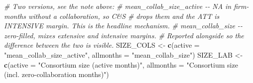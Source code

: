 \documentclass[
]{article}
\newenvironment{Shaded}{\begin{snugshade}}{\end{snugshade}}
\newcommand{\AttributeTok}[1]{\textcolor[rgb]{0.13,0.29,0.53}{#1}}
\newcommand{\CommentTok}[1]{\textcolor[rgb]{0.56,0.35,0.01}{\textit{#1}}}
\newcommand{\FunctionTok}[1]{\textcolor[rgb]{0.13,0.29,0.53}{\textbf{#1}}}
\newcommand{\NormalTok}[1]{#1}
\newcommand{\OtherTok}[1]{\textcolor[rgb]{0.56,0.35,0.01}{#1}}
\newcommand{\StringTok}[1]{\textcolor[rgb]{0.31,0.60,0.02}{#1}}
\begin{document}
\begin{Shaded}
\begin{Highlighting}[]
\CommentTok{\# Two versions, see the note above:}
\CommentTok{\#   mean\_collab\_size\_active {-}{-} NA in firm{-}months without a collaboration, so C\&S}
\CommentTok{\#     drops them and the ATT is INTENSIVE margin. This is the headline mechanism.}
\CommentTok{\#   mean\_collab\_size        {-}{-} zero{-}filled, mixes extensive and intensive margins.}
\CommentTok{\#     Reported alongside so the difference between the two is visible.}
\NormalTok{SIZE\_COLS }\OtherTok{\textless{}{-}} \FunctionTok{c}\NormalTok{(}\AttributeTok{active =} \StringTok{"mean\_collab\_size\_active"}\NormalTok{, }\AttributeTok{allmonths =} \StringTok{"mean\_collab\_size"}\NormalTok{)}
\NormalTok{SIZE\_LAB  }\OtherTok{\textless{}{-}} \FunctionTok{c}\NormalTok{(}\AttributeTok{active =} \StringTok{"Consortium size (active months)"}\NormalTok{,}
               \AttributeTok{allmonths =} \StringTok{"Consortium size (incl. zero{-}collaboration months)"}\NormalTok{)}


\end{Highlighting}
\end{Shaded}
\end{document}
